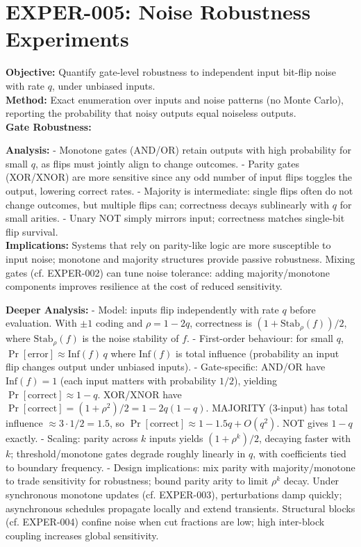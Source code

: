\documentclass{article}
\begin{document}
\section{EXPER-005: Noise Robustness Experiments}
\textbf{Objective:} Quantify gate-level robustness to independent input bit-flip noise with rate $q$, under unbiased inputs.\\
\textbf{Method:} Exact enumeration over inputs and noise patterns (no Monte Carlo), reporting the probability that noisy outputs equal noiseless outputs.\\
\textbf{Gate Robustness:}\\
\begin{center}
\end{center}
\textbf{Analysis:}
- Monotone gates (AND/OR) retain outputs with high probability for small $q$, as flips must jointly align to change outcomes.
- Parity gates (XOR/XNOR) are more sensitive since any odd number of input flips toggles the output, lowering correct rates.
- Majority is intermediate: single flips often do not change outcomes, but multiple flips can; correctness decays sublinearly with $q$ for small arities.
- Unary NOT simply mirrors input; correctness matches single-bit flip survival.\\
\textbf{Implications:} Systems that rely on parity-like logic are more susceptible to input noise; monotone and majority structures provide passive robustness. Mixing gates (cf. EXPER-002) can tune noise tolerance: adding majority/monotone components improves resilience at the cost of reduced sensitivity.

\textbf{Deeper Analysis:}
- Model: inputs flip independently with rate $q$ before evaluation. With $\pm 1$ coding and $\rho = 1-2q$, correctness is $(1+\mathrm{Stab}_\rho(f))/2$, where $\mathrm{Stab}_\rho(f)$ is the noise stability of $f$.
- First-order behaviour: for small $q$, $\Pr[\text{error}] \approx \mathrm{Inf}(f)\,q$ where $\mathrm{Inf}(f)$ is total influence (probability an input flip changes output under unbiased inputs).
- Gate-specific: AND/OR have $\mathrm{Inf}(f)=1$ (each input matters with probability $1/2$), yielding $\Pr[\text{correct}]\approx 1-q$. XOR/XNOR have $\Pr[\text{correct}] = (1+\rho^2)/2 = 1-2q(1-q)$. MAJORITY (3-input) has total influence $\approx 3\cdot 1/2 = 1.5$, so $\Pr[\text{correct}]\approx 1-1.5q + O(q^2)$. NOT gives $1-q$ exactly.
- Scaling: parity across $k$ inputs yields $(1+\rho^k)/2$, decaying faster with $k$; threshold/monotone gates degrade roughly linearly in $q$, with coefficients tied to boundary frequency.
- Design implications: mix parity with majority/monotone to trade sensitivity for robustness; bound parity arity to limit $\rho^k$ decay. Under synchronous monotone updates (cf. EXPER-003), perturbations damp quickly; asynchronous schedules propagate locally and extend transients. Structural blocks (cf. EXPER-004) confine noise when cut fractions are low; high inter-block coupling increases global sensitivity.
\end{document}
